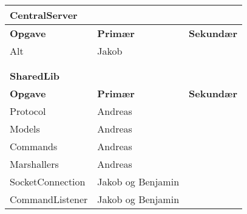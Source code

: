 \begin{table}[H]
\begin{tabular}{lll}
		
		\multicolumn{3}{|l|}{\color{lblue} \textbf{CentralServer}}                                                                                                               \\ \hline
		\multicolumn{1}{|l|}{\textbf{Opgave}}           & \multicolumn{1}{l|}{\textbf{Primær}}                       & \multicolumn{1}{l|}{\textbf{Sekundær}} \\ \hline
		\multicolumn{1}{|l|}{Alt}         & \multicolumn{1}{l|}{Jakob}                                  & \multicolumn{1}{l|}{}                  \\ \hline
		& & \\& & \\ \hline 
		
		
		\multicolumn{3}{|l|}{\color{lblue} \textbf{SharedLib}}                                                                                                               \\ \hline
		\multicolumn{1}{|l|}{\textbf{Opgave}}           & \multicolumn{1}{l|}{\textbf{Primær}}                       & \multicolumn{1}{l|}{\textbf{Sekundær}} \\ \hline
		\multicolumn{1}{|l|}{Protocol}         & \multicolumn{1}{l|}{Andreas}                                  & \multicolumn{1}{l|}{}                  \\ \hline
		\multicolumn{1}{|l|}{Models}         & \multicolumn{1}{l|}{Andreas}                                  & \multicolumn{1}{l|}{}                  \\ \hline
		\multicolumn{1}{|l|}{Commands}         & \multicolumn{1}{l|}{Andreas}                                  & \multicolumn{1}{l|}{}                  \\ \hline
		\multicolumn{1}{|l|}{Marshallers}         & \multicolumn{1}{l|}{Andreas}                                  & \multicolumn{1}{l|}{}                  \\ \hline
		\multicolumn{1}{|l|}{SocketConnection}         & \multicolumn{1}{l|}{Jakob og Benjamin}                                  & \multicolumn{1}{l|}{}                  \\ \hline
		\multicolumn{1}{|l|}{CommandListener}         & \multicolumn{1}{l|}{Jakob og Benjamin}                                  & \multicolumn{1}{l|}{}                  \\ \hline
		
		
		
	\end{tabular}
\end{table}